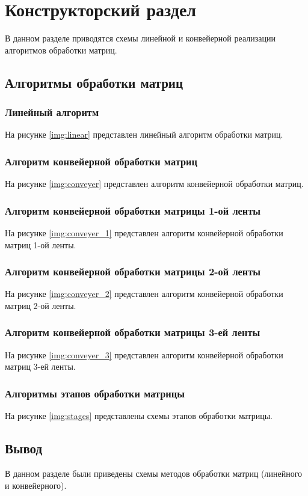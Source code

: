 \chapter{Конструкторский раздел}
В данном разделе приводятся схемы линейной и конвейерной реализации алгоритмов обработки матриц.

\section{Алгоритмы обработки матриц}
\subsection{Линейный алгоритм}
На рисунке \ref{img:linear} представлен линейный алгоритм обработки матриц. 
\newpage
\subsection{Алгоритм конвейерной обработки матриц}
На рисунке \ref{img:conveyer} представлен алгоритм конвейерной обработки матриц. 
\newpage
\subsection{Алгоритм конвейерной обработки матрицы 1-ой ленты}
На рисунке \ref{img:conveyer_1} представлен алгоритм конвейерной обработки матриц 1-ой ленты. 
\newpage
\subsection{Алгоритм конвейерной обработки матрицы 2-ой ленты}
На рисунке \ref{img:conveyer_2} представлен алгоритм конвейерной обработки матриц 2-ой ленты. 
\newpage
\subsection{Алгоритм конвейерной обработки матрицы 3-ей ленты}
На рисунке \ref{img:conveyer_3} представлен алгоритм конвейерной обработки матриц 3-ей ленты. 
\newpage
\subsection{Алгоритмы  этапов обработки матрицы}
На рисунке \ref{img:stages} представлены схемы этапов обработки матрицы. 
\section*{Вывод}
В данном разделе были приведены схемы методов обработки матриц (линейного и конвейерного).
